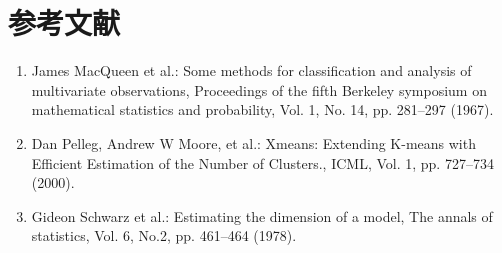 \section*{参考文献}
\begin{enumerate}
\renewcommand{\labelenumi}{\arabic{enumi})}
  \item James MacQueen et al.:
    Some methods for classification and analysis of multivariate observations,
    Proceedings of the fifth Berkeley symposium on mathematical statistics and probability,
    Vol. 1, No. 14, pp. 281--297 (1967).
  \item Dan Pelleg, Andrew W Moore, et al.:
    Xmeans: Extending K-means with Efficient Estimation of the Number of Clusters.,
    ICML, Vol. 1, pp. 727--734 (2000).
  \item Gideon Schwarz et al.:
    Estimating the dimension of a model,
    The annals of statistics, Vol. 6, No.2, pp. 461--464 (1978).
\end{enumerate}
